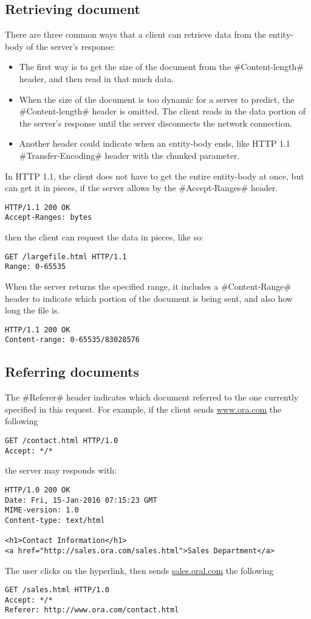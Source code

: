 \documentclass[a4paper]{article}
\begin{document}
\subsection{Retrieving document}

There are three common ways that a client can retrieve data from the entity-body of the server's response:
\begin{itemize}
  \item The first way is to get the size of the document from the #Content-length# header,
	and then read in that much data.
  \item When the size of the document is too dynamic for a server to predict,
	the #Content-length# header is omitted.
	The client reads in the data portion of the server's response until the server disconnects the network connection.
  \item Another header could indicate when an entity-body ends, like HTTP 1.1 #Transfer-Encoding# header with the chunked parameter.
\end{itemize}

In HTTP 1.1, the client does not have to get the entire entity-body at once,
but can get it in pieces, if the server allows by the #Accept-Ranges# header.
\begin{verbatim}
HTTP/1.1 200 OK
Accept-Ranges: bytes
\end{verbatim}
then the client can request the data in pieces, like so:
\begin{verbatim}
GET /largefile.html HTTP/1.1
Range: 0-65535
\end{verbatim}
When the server returns the specified range,
it includes a #Content-Range# header to indicate which portion of the document is being sent,
and also how long the file is.
\begin{verbatim}
HTTP/1.1 200 OK
Content-range: 0-65535/83028576
\end{verbatim}

\subsection{Referring documents}

The #Referer# header indicates which document referred to the one currently specified in this request.
For example, if the client sends \url{www.ora.com} the following
\begin{verbatim}
GET /contact.html HTTP/1.0
Accept: */*
\end{verbatim}
the server may responds with:
\begin{verbatim}
HTTP/1.0 200 OK
Date: Fri, 15-Jan-2016 07:15:23 GMT
MIME-version: 1.0
Content-type: text/html

<h1>Contact Information</h1>
<a href="http://sales.ora.com/sales.html">Sales Department</a>
\end{verbatim}
The user clicks on the hyperlink, then sends \url{sales.oral.com} the following
\begin{verbatim}
GET /sales.html HTTP/1.0
Accept: */*
Referer: http://www.ora.com/contact.html
\end{verbatim}
\end{document}
